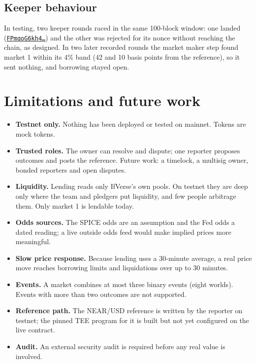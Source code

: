 \documentclass[11pt,a4paper]{article}
\newcommand{\code}[1]{\texttt{\small #1}}
\newcommand{\tx}[2]{\href{https://testnet.nearblocks.io/txns/#1}{\code{#2\ldots}}}
\begin{document}
\subsection{Keeper behaviour}

In testing, two keeper rounds raced in the same 100-block window: one landed
(\tx{FPmqoG6kh4mcRr8gn3b5xZ7ixQK4HreTRKuYSDw63XPt}{FPmqoG6kh4}) and the other was rejected for its nonce without reaching
the chain, as designed. In two later recorded rounds the market maker step found market 1 within its 4\% band
(42 and 10 basis points from the reference), so it sent nothing, and borrowing stayed open.

\section{Limitations and future work}
\label{sec:limits}

\begin{itemize}
\item \textbf{Testnet only.} Nothing has been deployed or tested on mainnet. Tokens are mock tokens.
\item \textbf{Trusted roles.} The owner can resolve and dispute; one reporter proposes outcomes and posts the
reference. Future work: a timelock, a multisig owner, bonded reporters and open disputes.
\item \textbf{Liquidity.} Lending reads only IfVerse's own pools. On testnet they are deep only where the team and
pledgers put liquidity, and few people arbitrage them. Only market 1 is lendable today.
\item \textbf{Odds sources.} The SPICE odds are an assumption and the Fed odds a dated reading; a live outside odds
feed would make implied prices more meaningful.
\item \textbf{Slow price response.} Because lending uses a 30-minute average, a real price move reaches borrowing
limits and liquidations over up to 30 minutes.
\item \textbf{Events.} A market combines at most three binary events (eight worlds). Events with more than two outcomes
are not supported.
\item \textbf{Reference path.} The NEAR/USD reference is written by the reporter on testnet; the pinned TEE program for
it is built but not yet configured on the live contract.
\item \textbf{Audit.} An external security audit is required before any real value is involved.
\end{itemize}
\end{document}
